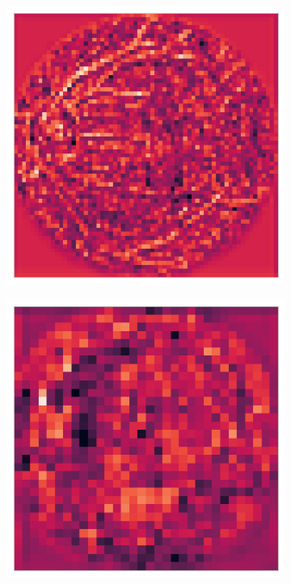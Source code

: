 \begin{figure}
\begin{subfigure}[b]{0.19\textwidth}
    \end{subfigure}
    \hfill
    \begin{subfigure}[b]{0.19\textwidth}
         \centering
         \includegraphics[width=\textwidth, height=\textwidth]{figures/chapter6/features/9521_left/9521_left_2.png}
    \end{subfigure}
    \hfill
    \begin{subfigure}[b]{0.19\textwidth}
        \centering
        \includegraphics[width=\textwidth, height=\textwidth]{figures/chapter6/features/9521_left/9521_left_3.png}

\end{subfigure}
\end{figure}

